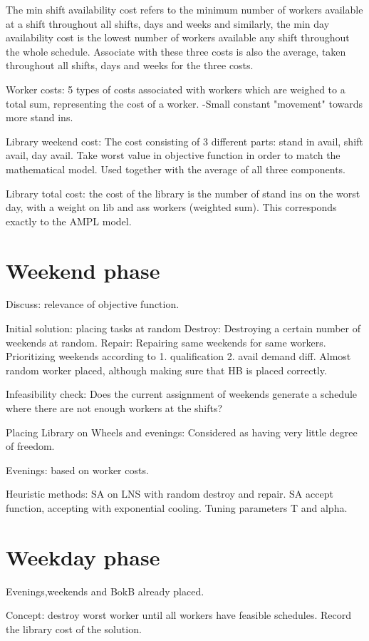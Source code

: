 The min shift availability cost refers to the minimum number of workers available at a shift throughout all shifts, days and weeks and similarly, the min day availability cost is the lowest number of workers available any shift throughout the whole schedule. Associate with these three costs is also the average, taken throughout all shifts, days and weeks for the three costs.

Worker costs: 5 types of costs associated with workers which are weighed to a total sum, representing the cost of a worker. -Small constant "movement" towards more stand ins.

Library weekend cost: The cost consisting of 3 different parts: stand in avail, shift avail, day avail. Take worst value in objective function in order to match the mathematical model. Used together with the average of all three components. 

Library total cost: the cost of the library is the number of stand ins on the worst day, with a weight on lib and ass workers (weighted sum). This corresponds exactly to the AMPL model.

\section{Weekend phase}
Discuss: relevance of objective function.

Initial solution: placing tasks at random
Destroy: Destroying a certain number of weekends at random.
Repair: Repairing same weekends for same workers. Prioritizing weekends according to 1. qualification 2. avail demand diff. Almost random worker placed, although making sure that HB is placed correctly.

Infeasibility check: Does the current assignment of weekends generate a schedule where there are not enough workers at the shifts?

Placing Library on Wheels and evenings: Considered as having very little degree of freedom. 

Evenings: based on worker costs.

Heuristic methods: SA on LNS with random destroy and repair. SA accept function, accepting with exponential cooling. Tuning parameters T and alpha.

\section{Weekday phase}
Evenings,weekends and BokB already placed. 

Concept: destroy worst worker until all workers have feasible schedules. Record the library cost of the solution. 

